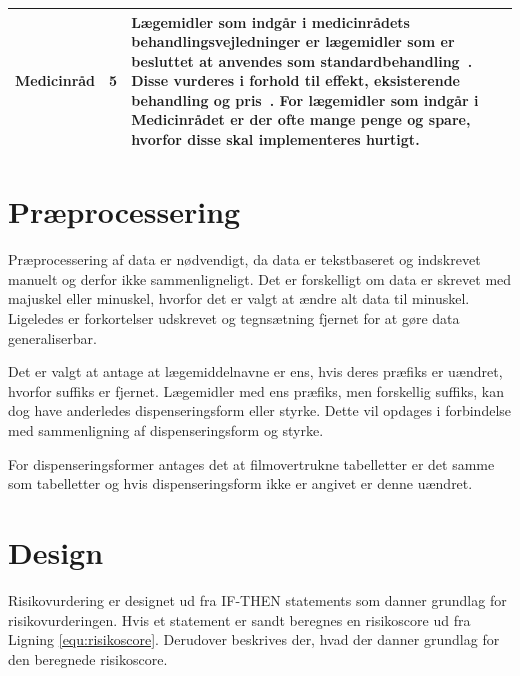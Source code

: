 \begin{longtable}{p{3.5cm}| p{1cm} | p{9.5cm}}
 \\ \hline 
\textbf{Medicinråd} & 5 & Lægemidler som indgår i medicinrådets behandlingsvejledninger er lægemidler som er besluttet at anvendes som standardbehandling~\citep{Medicinradet2018}. Disse vurderes i forhold til effekt, eksisterende behandling og pris~\citep{Medicinradet2018}. For lægemidler som indgår i Medicinrådet er der ofte mange penge og spare, hvorfor disse skal implementeres hurtigt. \\ \hline 
    \end{longtable}

\section{Præprocessering}
Præprocessering af data er nødvendigt, da data er tekstbaseret og indskrevet manuelt og derfor ikke sammenligneligt. Det er forskelligt om data er skrevet med majuskel eller minuskel, hvorfor det er valgt at ændre alt data til minuskel. Ligeledes er forkortelser udskrevet og tegnsætning fjernet for at gøre data generaliserbar. 

Det er valgt at antage at lægemiddelnavne er ens, hvis deres præfiks er uændret, hvorfor suffiks er fjernet. Lægemidler med ens præfiks, men forskellig suffiks, kan dog have anderledes dispenseringsform eller styrke. Dette vil opdages i forbindelse med sammenligning af dispenseringsform og styrke. 

For dispenseringsformer antages det at filmovertrukne tabelletter er det samme som tabelletter og hvis dispenseringsform ikke er angivet er denne uændret.

\section{Design}
Risikovurdering er designet ud fra IF-THEN statements som danner grundlag for risikovurderingen. Hvis et statement er sandt beregnes en risikoscore ud fra Ligning \ref{equ:risikoscore}. Derudover beskrives der, hvad der danner grundlag for den beregnede risikoscore.

